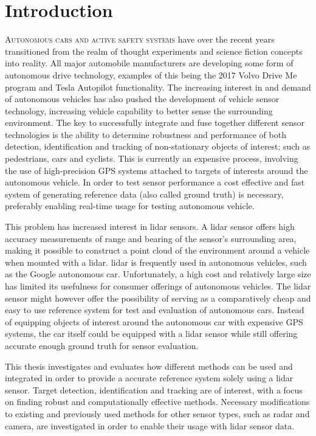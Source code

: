 







\chapter{Introduction}
\lettrine[lines=4, loversize=-0.1, lraise=0.1]{A}{utonomous cars and active safety systems} have over the recent years transitioned from the realm of thought experiments and science fiction concepts into reality. All major automobile manufacturers are developing some form of autonomous drive technology, examples of this being the 2017 Volvo Drive Me program and Tesla Autopilot functionality. The increasing interest in and demand of autonomous vehicles has also pushed the development of vehicle sensor technology, increasing vehicle capability to better sense the surrounding environment. The key to successfully integrate and fuse together different sensor technologies is the ability to determine robustness and performance of both detection, identification and tracking of non-stationary objects of interest; such as pedestrians, cars and cyclists. This is currently an expensive process, involving the use of high-precision GPS systems attached to targets of interests around the autonomous vehicle. In order to test sensor performance a cost effective and fast system of generating reference data (also called ground truth) is necessary, preferably enabling real-time usage for testing autonomous vehicle.

This problem has increased interest in lidar sensors. A lidar sensor offers high accuracy measurements of range and bearing of the sensor's surrounding area, making it possible to construct a point cloud of the environment around a vehicle when mounted with a lidar. lidar is frequently used in autonomous vehicles, such as the Google autonomous car. Unfortunately, a high cost and relatively large size has limited its usefulness for consumer offerings of autonomous vehicles. The lidar sensor might however offer the possibility of serving as a comparatively cheap and easy to use reference system for test and evaluation of autonomous cars. Instead of equipping objects of interest around the autonomous car with expensive GPS systems, the car itself could be equipped with a lidar sensor while still offering accurate enough ground truth for sensor evaluation.

This thesis investigates and evaluates how different methods can be used and integrated in order to provide a accurate reference system solely using a lidar sensor. Target detection, identification and tracking are of interest, with a focus on finding robust and computationally effective methods. Necessary modifications to existing and previously used methods for other sensor types, such as radar and camera, are investigated in order to enable their usage with lidar sensor data.  

